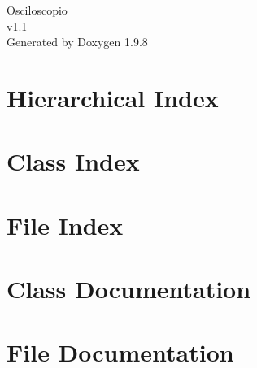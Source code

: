 \documentclass[twoside]{book}
\newcommand{\+}{\discretionary{\mbox{\scriptsize$\hookleftarrow$}}{}{}}
\newcommand{\clearemptydoublepage}{%
    \newpage{\pagestyle{empty}\cleardoublepage}%
  }
\begin{document}
  \raggedbottom
    \hypersetup{pageanchor=false,
                bookmarksnumbered=true,
                pdfencoding=unicode
               }
  \begin{titlepage}
  \vspace*{7cm}
  \begin{center}%
  {\Large Osciloscopio}\\
  [1ex]\large v1.\+1 \\
  \vspace*{1cm}
  {\large Generated by Doxygen 1.9.8}\\
  \end{center}
  \end{titlepage}
  \clearemptydoublepage
  \tableofcontents
  \clearemptydoublepage
  \hypersetup{pageanchor=true}
\chapter{Hierarchical Index}

\chapter{Class Index}

\chapter{File Index}

\chapter{Class Documentation}











\chapter{File Documentation}


















  \backmatter
  \newpage
  \clearemptydoublepage
  \printindex
\end{document}
